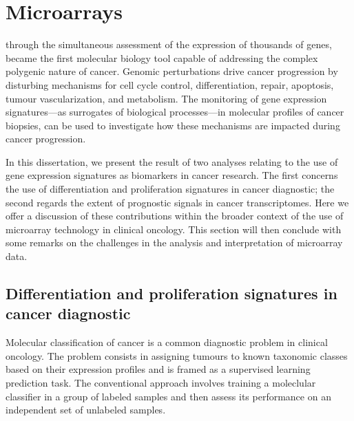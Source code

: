\section{Microarrays}
\label{microarray-discussion}


 through the simultaneous assessment of the
expression of thousands of genes, became the first molecular biology tool
capable of addressing the complex polygenic nature of
cancer.\cite{grant_microarrays_2004} Genomic perturbations drive cancer
progression by disturbing mechanisms for cell cycle control, differentiation,
 repair, apoptosis, tumour vascularization, and metabolism.  The
monitoring of gene expression signatures---as surrogates of biological
processes---in molecular profiles of cancer biopsies, can be used to investigate
how these mechanisms are impacted during cancer progression.


In this dissertation, we present the result of two analyses relating to the use
of gene expression signatures as biomarkers in cancer research.  The first
concerns the use of differentiation and proliferation signatures in cancer
diagnostic; the second regards the extent of prognostic signals in cancer
transcriptomes.  Here we offer a discussion of these contributions within the
broader context of the use of microarray technology in clinical oncology.  This
section will then conclude with some remarks on the challenges in the analysis
and interpretation of microarray data.

\subsection{Differentiation and proliferation signatures in cancer diagnostic}
\label{discussion-differentiation-microarrays}
Molecular classification of cancer is a common diagnostic problem in clinical
oncology.\cite{golub_molecular_1999,alizadeh_distinct_2000,bullinger_use_2004}
The problem consists in assigning tumours to known taxonomic classes based on
their expression profiles and is framed as a supervised learning prediction
task.  The conventional approach involves training a moleclular classifier in a
group of labeled samples and then assess its performance on an independent set
of unlabeled samples.\cite{golub_molecular_1999}

